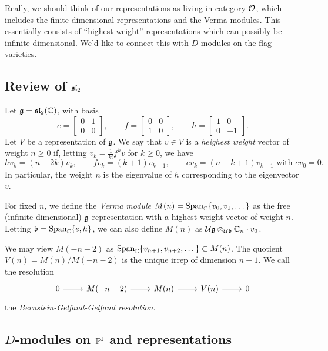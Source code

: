 \documentclass{article}
\begin{document}
Really, we should think of our representations as living in category $\mathcal{O}$, which includes the finite dimensional representations and the Verma modules.
This essentially consists of ``highest weight'' representations which can possibly be infinite-dimensional.
We'd like to connect this with $D$-modules on the flag varieties.

\subsection{Review of $\mathfrak{sl}_2$}

Let $\mathfrak{g} = \mathfrak{sl}_2(\mathbb{C})$, with basis
\[
	e = \begin{bmatrix}
		0 & 1 \\
		0 & 0
	\end{bmatrix}, \hspace{2em}
	f = \begin{bmatrix}
		0 & 0 \\
		1 & 0
	\end{bmatrix}, \hspace{2em}
	h = \begin{bmatrix}
		1 & 0 \\
		0 & -1 
	\end{bmatrix}.
\]
Let $V$ be a representation of $\mathfrak{g}$.
We say that $v \in V$ is a \emph{heighest weight} vector of weight $n \geq 0$ if, letting $v_k = \frac{1}{k!} f^k v$ for $k \geq 0$, we have
\[
	h v_k = (n - 2k) v_k, \hspace{2em} f v_k = (k + 1) v_{k+1}, \hspace{2em} e v_k = (n - k + 1) v_{k-1} \textrm{ with } e v_0 = 0.
\]
In particular, the weight $n$ is the eigenvalue of $h$ corresponding to the eigenvector $v$.

For fixed $n$, we define the \emph{Verma module} $M(n) = \operatorname{Span}_{\mathbb{C}} \{ v_0, v_1, \dots \}$ as the free (infinite-dimensional) $\mathfrak{g}$-representation with a highest weight vector of weight $n$.
Letting $\mathfrak{b} = \operatorname{Span}_{\mathbb{C}} \{e, h\}$, we can also define $M(n)$ as $\mathcal{U} \mathfrak{g} \otimes_{\mathcal{U} \mathfrak{b}} \mathbb{C}_n \cdot v_0$.

We may view $M(-n-2)$ as $\operatorname{Span}_{\mathbb{C}} \{v_{n+1}, v_{n+2}, \dots\} \subset M(n)$.
The quotient $V(n) = M(n) / M(-n-2)$ is the unique irrep of dimension $n + 1$.
We call the resolution
\[
	\SES{M(-n-2)}{M(n)}{V(n)}
\]
the \emph{Bernstein-Gelfand-Gelfand resolution}.

\subsection{$D$-modules on $\mathbb{P}^1$ and representations}
\end{document}
